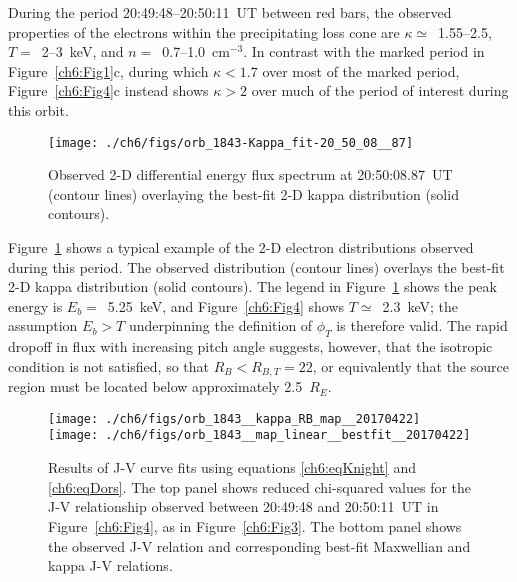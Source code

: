  During the period 20:49:48--20:50:11~UT between red bars, the
  observed properties of the electrons within the precipitating loss
  cone are $\kappa \simeq $~1.55--2.5, $T =$~2--3~keV, and $n
  =$~0.7--1.0~cm$^{-3}$. In contrast with the marked period in
  Figure~\ref{ch6:Fig1}c, during which $\kappa < 1.7$ over most of the
  marked period, Figure~\ref{ch6:Fig4}c instead shows $\kappa > 2$
  over much of the period of interest during this orbit.


  \begin{figure}
    \centering
    \noindent\texttt{[image: ./ch6/figs/orb\_1843-Kappa\_fit-20\_50\_08\_\_87]}
    \caption[Example two-dimensional fit of inverted V precipitation
    (Orbit 1843)]{Observed 2-D differential energy flux spectrum at
      20:50:08.87~UT (contour lines) overlaying the best-fit 2-D kappa
      distribution (solid contours).}
    \label{ch6:Fig5}
  \end{figure}


  Figure~\ref{ch6:Fig5} shows a typical example of the 2-D electron
  distributions observed during this period. The observed distribution
  (contour lines) overlays the best-fit 2-D kappa distribution (solid
  contours). The legend in Figure~\ref{ch6:Fig5} shows the peak energy
  is $E_b =$~5.25~keV, and Figure~\ref{ch6:Fig4} shows $T
  \simeq$~2.3~keV; the assumption $E_b > T$ underpinning the
  definition of $\phi_T$ is therefore valid. The rapid dropoff in flux
  with increasing pitch angle suggests, however, that the isotropic
  condition is not satisfied, so that $R_B < R_{B,T} = 22$, or
  equivalently that the source region must be located below
  approximately 2.5~$R_E$.


  \begin{figure}
    \centering
    \noindent\texttt{[image: ./ch6/figs/orb\_1843\_\_kappa\_RB\_map\_\_20170422]}
    \noindent\texttt{[image: ./ch6/figs/orb\_1843\_\_map\_linear\_\_bestfit\_\_20170422]}
    \caption[Orbit 1843: Reduced chi-squared values for observed J-V
    curves and corresponding best-fit J-V curves.]{Results of J-V
      curve fits using equations \ref{ch6:eqKnight} and
      \ref{ch6:eqDors}. The top panel shows reduced chi-squared values
      for the J-V relationship observed between 20:49:48 and
      20:50:11~UT in Figure~\ref{ch6:Fig4}, as in
      Figure~\ref{ch6:Fig3}. The bottom panel shows the observed J-V
      relation and corresponding best-fit Maxwellian and kappa J-V relations.}
    \label{ch6:Fig6}
  \end{figure}

